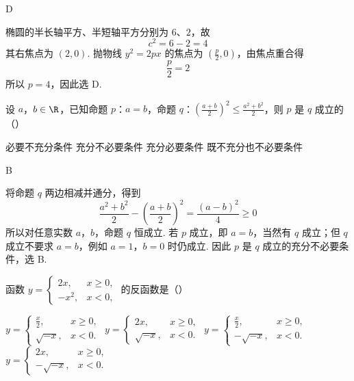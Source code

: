 \begin{answer}
D
\end{answer}

\begin{solution}
椭圆的半长轴平方、半短轴平方分别为 \(6\)、\(2\)，故
\[
c^2=6-2=4
\]
其右焦点为 \((2,0)\). 抛物线 \(y^2=2px\) 的焦点为 \((\frac{p}{2},0)\)，由焦点重合得
\[
\frac p2=2
\]
所以 \(p=4\)，因此选 D.
\end{solution}

\begin{problem}
设 \(a\)，\(b \in \R\)，已知命题 \(p\)：\(a = b\)，命题 \(q\)：\(\left(\frac{a + b}{2}\right)^2 \leqslant \frac{a^2 + b^2}{2}\)，则 \(p\) 是 \(q\) 成立的（\quad）

\choices
    {必要不充分条件}
    {充分不必要条件}
    {充分必要条件}
    {既不充分也不必要条件}
\end{problem}

\begin{answer}
B
\end{answer}

\begin{solution}
将命题 \(q\) 两边相减并通分，得到
\[
\frac{a^2+b^2}{2}-\left(\frac{a+b}{2}\right)^2
=\frac{(a-b)^2}{4}\geqslant0
\]
所以对任意实数 \(a\)，\(b\)，命题 \(q\) 恒成立. 若 \(p\) 成立，即 \(a=b\)，当然有 \(q\) 成立；但 \(q\) 成立不要求 \(a=b\)，例如 \(a=1\)，\(b=0\) 时仍成立. 因此 \(p\) 是 \(q\) 成立的充分不必要条件，选 B.
\end{solution}

\begin{problem}
函数 \(y = \begin{cases}
2x, & x \geqslant 0,\\
-x^2, & x < 0,
\end{cases}\) 的反函数是（\quad）

\choices
    {\(y = \begin{cases}
\frac{x}{2}, & x \geqslant 0,\\
\sqrt{-x}, & x < 0.
\end{cases}\)}
    {\(y = \begin{cases}
2x, & x \geqslant 0,\\
\sqrt{-x}, & x < 0.
\end{cases}\)}
    {\(y = \begin{cases}
\frac{x}{2}, & x \geqslant 0,\\
-\sqrt{-x}, & x < 0.
\end{cases}\)}
    {\(y = \begin{cases}
2x, & x \geqslant 0,\\
-\sqrt{-x}, & x < 0.
\end{cases}\)}
\end{problem}

